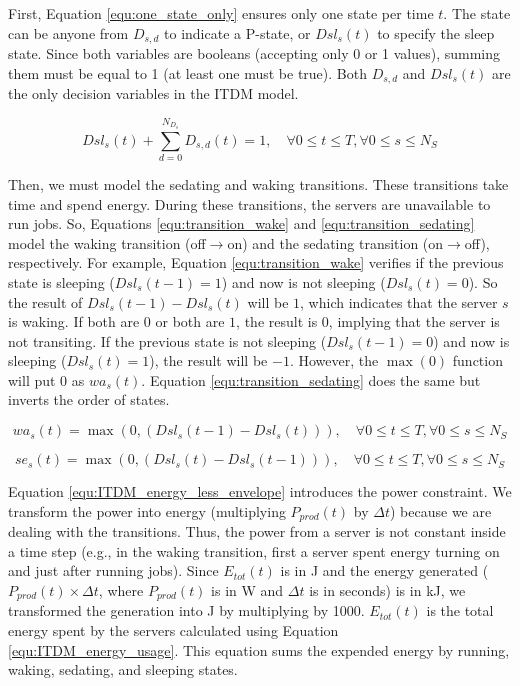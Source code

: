 



First, Equation \ref{equ:one_state_only} ensures only one state per time $t$. The state can be anyone from $D_{s,d}$ to indicate a P-state, or $Dsl_{s}(t)$ to specify the sleep state. Since both variables are booleans (accepting only 0 or 1 values), summing them must be equal to 1 (at least one must be true). Both $D_{s,d}$ and $Dsl_{s}(t)$ are the only decision variables in the ITDM model.

\begin{equation}
    \label{equ:one_state_only}
    Dsl_{s}(t) + \sum_{d=0}^{N_{D_{s}}} D_{s,d}(t) = 1, \quad \forall 0 \le t \le T, \forall 0 \le s \le N_{S}
\end{equation}

Then, we must model the sedating and waking transitions. These transitions take time and spend energy. During these transitions, the servers are unavailable to run jobs. So, Equations \ref{equ:transition_wake} and \ref{equ:transition_sedating} model the waking transition (off$\rightarrow$on) and the sedating transition (on$\rightarrow$off), respectively. For example, Equation \ref{equ:transition_wake} verifies if the previous state is sleeping ($Dsl_{s}(t-1) = 1$) and now is not sleeping ($Dsl_{s}(t) = 0$). So the result of $Dsl_{s}(t-1) - Dsl_{s}(t)$ will be $1$, which indicates that the server $s$ is waking. If both are $0$ or both are $1$, the result is $0$, implying that the server is not transiting. If the previous state is not sleeping ($Dsl_{s}(t-1) = 0$) and now is sleeping ($Dsl_{s}(t) = 1$), the result will be $-1$. However, the $\max (0)$ function will put 0 as $wa_s(t)$. Equation \ref{equ:transition_sedating} does the same but inverts the order of states.

\begin{equation}
    \label{equ:transition_wake}
    wa_{s}(t) = \max(0, (Dsl_{s}(t-1) - Dsl_{s}(t))), \quad \forall 0 \le t \le T, \forall 0 \le s \le N_{S}
\end{equation}

\begin{equation}
    \label{equ:transition_sedating}
    se_{s}(t) = \max(0, (Dsl_{s}(t) - Dsl_{s}(t-1))), \quad \forall 0 \le t \le T, \forall 0 \le s \le N_{S}
\end{equation}

Equation \ref{equ:ITDM_energy_less_envelope} introduces the power constraint. We transform the power into energy (multiplying $P_{prod}(t)$ by $\Delta t$) because we are dealing with the transitions. Thus, the power from a server is not constant inside a time step (e.g., in the waking transition, first a server spent energy turning on and just after running jobs). Since $E_{tot}(t)$ is in J and the energy generated ($P_{prod}(t) \times \Delta t$, where $P_{prod}(t)$ is in W and $\Delta t$ is in seconds) is in kJ, we transformed the generation into J by multiplying by 1000. $E_{tot}(t)$ is the total energy spent by the servers calculated using Equation \ref{equ:ITDM_energy_usage}. This equation sums the expended energy by running, waking, sedating, and sleeping states.

